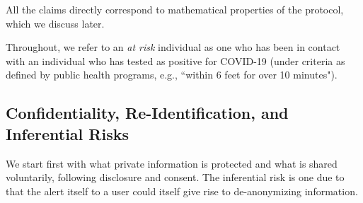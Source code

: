 \documentclass{article}
\newcommand{\sk}[1]{\textsf{\color{magenta} SK: #1}}
\begin{document}
All the claims directly correspond to mathematical properties of the protocol, which we discuss later.


Throughout, we refer to an \emph{at risk} individual as one who has been in contact with an individual who has tested as positive for COVID-19 (under criteria as defined by public health programs, e.g., ``within 6 feet for over 10 minutes").

\subsection{Confidentiality, Re-Identification, and Inferential Risks}

We start first with what private information is protected and what is shared voluntarily, following disclosure and consent.  The inferential risk is one due to that the alert itself to a user could itself give rise to de-anonymizing information.


\end{document}
